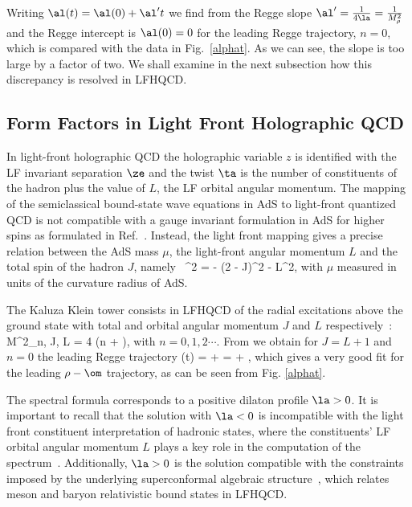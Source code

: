 \documentclass[aps,prd,preprint,groupedaddress]{revtex4-1}
\begin{document}
Writing $\al(t) = \al(0) + \al' t$ we find from  the Regge slope  $\al' = \frac{1}{4 \la} = \frac{1}{M^2_\rho}$ and the Regge intercept is $\al(0)= 0$ for the leading Regge trajectory, $n=0$, which is compared with the data in Fig.~\ref{alphat}.  As we can see,  the slope is too large by a factor of two.  We shall examine in the next subsection how this discrepancy is resolved in LFHQCD.


\subsection{Form Factors in Light Front Holographic QCD  }


In light-front holographic QCD the holographic variable $z$ is identified with the LF invariant separation $\ze$ and the twist $\ta$ is the number of constituents of the hadron plus the value of $L$, the LF orbital angular momentum.  The mapping of the semiclassical bound-state wave equations in AdS to light-front quantized QCD  is not compatible with a gauge invariant formulation in AdS for higher spins as formulated in Ref.~\cite{Karch:2006pv}. Instead, the light front mapping gives a precise relation between the AdS mass $\mu$,  the light-front angular momentum $L$ and the total spin of the hadron $J$, namely~\cite{Brodsky:2014yha}
\beq {}
\mu^2 = - (2 - J)^2 - L^2,
\enq
with $\mu$ measured in units of the curvature radius of AdS.

The Kaluza Klein tower consists  in LFHQCD of the radial excitations above the ground state with total and orbital angular momentum $J$ and $L$ respectively~\cite{Brodsky:2014yha}:
\beq {}
M^2_{n, J, L} =  4 \la\left(n  + \right),
\enq
with $n=0,1,2 \cdots$. From  we obtain for  $J = L+1$ and $n=0$  the leading Regge trajectory
\beq {}
\al(t) = \half +  = \half + ,
\enq
which gives a very good fit for the leading $\rho-\om$  trajectory, as can be seen from Fig. \ref{alphat}. 


The spectral formula  corresponds to a positive dilaton profile $\la > 0$. It is important to recall that the solution with $\la <0$ is incompatible with the light front constituent interpretation of hadronic states, where the constituents' LF orbital angular momentum  $L$ plays a key role in the computation of the spectrum~\cite{Brodsky:2014yha}. Additionally, $\la>0$ is the solution compatible with the constraints imposed by the underlying superconformal algebraic structure~\cite{Dosch:2015nwa}, which relates meson and baryon relativistic bound states in LFHQCD.
\end{document}
